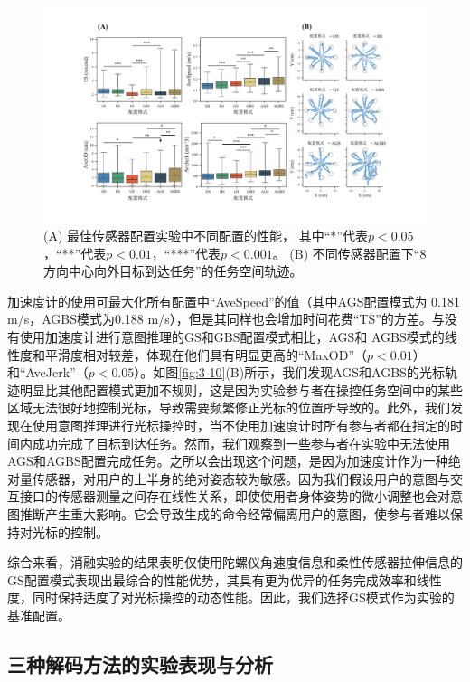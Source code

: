 \begin{figure}[htb]
    \centering
    \includegraphics[width=1\textwidth]{figures/3-Fig-12.pdf}
    \caption{(A) 最佳传感器配置实验中不同配置的性能， 其中``*''代表$p<0.05$，``**''代表$p<0.01$，``***''代表$p<0.001$。 (B) 不同传感器配置下``8 方向中心向外目标到达任务''的任务空间轨迹。}
    \label{fig:3-12}
\end{figure}  
加速度计的使用可最大化所有配置中``AveSpeed''的值（其中AGS配置模式为 0.181 m/s，AGBS模式为0.188 m/s），但是其同样也会增加时间花费``TS''的方差。与没有使用加速度计进行意图推理的GS和GBS配置模式相比，AGS和 AGBS模式的线性度和平滑度相对较差，体现在他们具有明显更高的``MaxOD''（$p<0.01$）和``AveJerk''（$p<0.05$）。如图\ref{fig:3-10}(B)所示，我们发现AGS和AGBS的光标轨迹明显比其他配置模式更加不规则，这是因为实验参与者在操控任务空间中的某些区域无法很好地控制光标，导致需要频繁修正光标的位置所导致的。此外，我们发现在使用意图推理进行光标操控时，当不使用加速度计时所有参与者都在指定的时间内成功完成了目标到达任务。然而，我们观察到一些参与者在实验中无法使用AGS和AGBS配置完成任务。之所以会出现这个问题，是因为加速度计作为一种绝对量传感器，对用户的上半身的绝对姿态较为敏感。因为我们假设用户的意图与交互接口的传感器测量之间存在线性关系，即使使用者身体姿势的微小调整也会对意图推断产生重大影响。它会导致生成的命令经常偏离用户的意图，使参与者难以保持对光标的控制。

综合来看，消融实验的结果表明仅使用陀螺仪角速度信息和柔性传感器拉伸信息的GS配置模式表现出最综合的性能优势，其具有更为优异的任务完成效率和线性度，同时保持适度了对光标操控的动态性能。因此，我们选择GS模式作为实验的基准配置。

\subsection{三种解码方法的实验表现与分析}     
